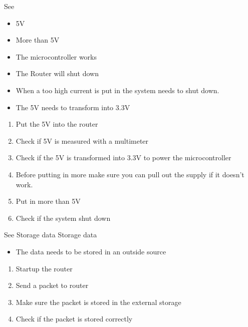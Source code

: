 {See }
{\begin{itemize}
    \item 5V
    \item More than 5V
\end{itemize}}
{\begin{itemize}
    \item The microcontroller works
    \item The Router will shut down
\end{itemize}}
{\begin{itemize}
    \item When a too high current is put in the system needs to shut down.
    \item The 5V needs to transform into 3.3V
\end{itemize}}
{\begin{enumerate}
    \item Put the 5V into the router
    \item Check if 5V is measured with a multimeter
    \item Check if the 5V is transformed into 3.3V to power the microcontroller
    \item Before putting in more make sure you can pull out the supply if it doesn't work.
    \item Put in more than 5V
    \item Check if the system shut down
\end{enumerate}}
 
{See }
{Storage data}
{Storage data}
{\begin{itemize}
    \item The data needs to be stored in an outside source
\end{itemize}}
{\begin{enumerate}
    \item Startup the router
    \item Send a packet to router
    \item Make sure the packet is stored in the external storage
    \item Check if the packet is stored correctly
\end{enumerate}}